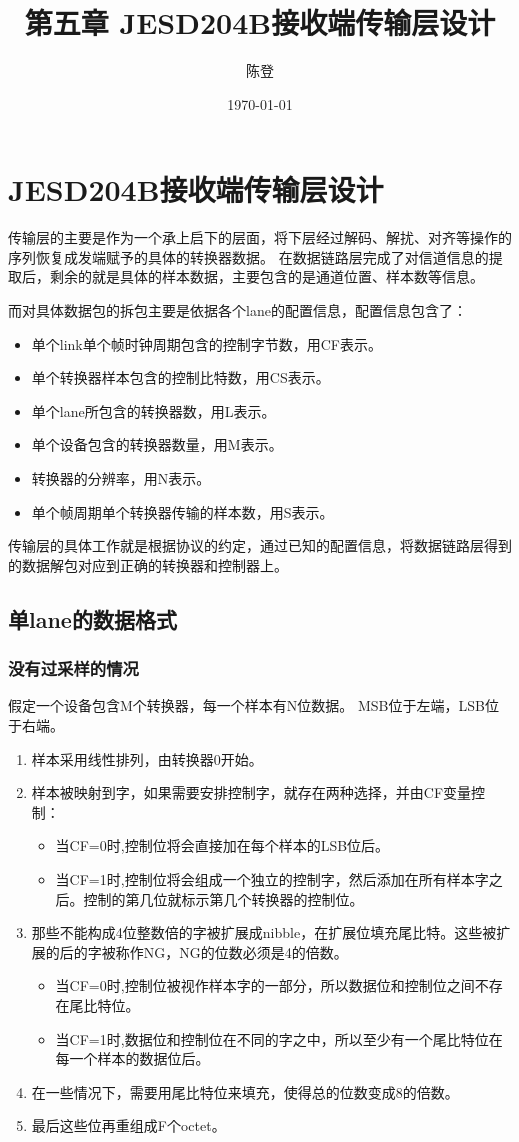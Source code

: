 \documentclass[UTF8]{ctexart}
\title{第五章 JESD204B接收端传输层设计}
\author{陈登}
\date{\today}
\begin{document}
\section{JESD204B接收端传输层设计}

传输层的主要是作为一个承上启下的层面，将下层经过解码、解扰、对齐等操作的序列恢复成发端赋予的具体的转换器数据。
在数据链路层完成了对信道信息的提取后，剩余的就是具体的样本数据，主要包含的是通道位置、样本数等信息。

而对具体数据包的拆包主要是依据各个lane的配置信息，配置信息包含了：
\begin{itemize}
  \item 单个link单个帧时钟周期包含的控制字节数，用CF表示。
  \item 单个转换器样本包含的控制比特数，用CS表示。
  \item 单个lane所包含的转换器数，用L表示。
  \item 单个设备包含的转换器数量，用M表示。
  \item 转换器的分辨率，用N表示。
  \item 单个帧周期单个转换器传输的样本数，用S表示。
\end{itemize}

传输层的具体工作就是根据协议的约定，通过已知的配置信息，将数据链路层得到的数据解包对应到正确的转换器和控制器上。

\subsection{单lane的数据格式}

\subsubsection{没有过采样的情况}

假定一个设备包含M个转换器，每一个样本有N位数据。
MSB位于左端，LSB位于右端。

\begin{enumerate}
	\item 样本采用线性排列，由转换器0开始。
	\item 样本被映射到字，如果需要安排控制字，就存在两种选择，并由CF变量控制：
	\begin{itemize}
		\item 当CF=0时,控制位将会直接加在每个样本的LSB位后。
		\item 当CF=1时,控制位将会组成一个独立的控制字，然后添加在所有样本字之后。控制的第几位就标示第几个转换器的控制位。
	\end{itemize}
	\item 那些不能构成4位整数倍的字被扩展成nibble，在扩展位填充尾比特。这些被扩展的后的字被称作NG，NG的位数必须是4的倍数。
	\begin{itemize}
		\item 当CF=0时,控制位被视作样本字的一部分，所以数据位和控制位之间不存在尾比特位。
		\item 当CF=1时,数据位和控制位在不同的字之中，所以至少有一个尾比特位在每一个样本的数据位后。
	\end{itemize}
	\item 在一些情况下，需要用尾比特位来填充，使得总的位数变成8的倍数。
	\item 最后这些位再重组成F个octet。
\end{enumerate}
\end{document}
